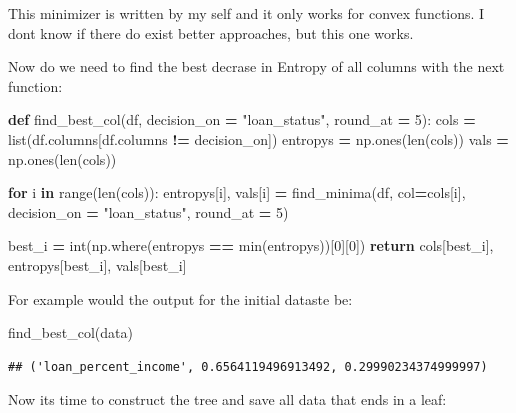 \documentclass[
]{book}
\newenvironment{Shaded}{\begin{snugshade}}{\end{snugshade}}
\newcommand{\BuiltInTok}[1]{#1}
\newcommand{\ControlFlowTok}[1]{\textcolor[rgb]{0.13,0.29,0.53}{\textbf{#1}}}
\newcommand{\DecValTok}[1]{\textcolor[rgb]{0.00,0.00,0.81}{#1}}
\newcommand{\KeywordTok}[1]{\textcolor[rgb]{0.13,0.29,0.53}{\textbf{#1}}}
\newcommand{\NormalTok}[1]{#1}
\newcommand{\OperatorTok}[1]{\textcolor[rgb]{0.81,0.36,0.00}{\textbf{#1}}}
\newcommand{\StringTok}[1]{\textcolor[rgb]{0.31,0.60,0.02}{#1}}
\begin{document}
This minimizer is written by my self and it only works for convex functions. I dont know if there do exist better approaches, but this one works.

Now do we need to find the best decrase in Entropy of all columns with the next function:

\begin{Shaded}
\begin{Highlighting}[]
\KeywordTok{def}\NormalTok{ find\_best\_col(df, decision\_on }\OperatorTok{=} \StringTok{"loan\_status"}\NormalTok{, round\_at }\OperatorTok{=} \DecValTok{5}\NormalTok{):}
\NormalTok{  cols }\OperatorTok{=} \BuiltInTok{list}\NormalTok{(df.columns[df.columns }\OperatorTok{!=}\NormalTok{ decision\_on])}
\NormalTok{  entropys }\OperatorTok{=}\NormalTok{ np.ones(}\BuiltInTok{len}\NormalTok{(cols))}
\NormalTok{  vals }\OperatorTok{=}\NormalTok{ np.ones(}\BuiltInTok{len}\NormalTok{(cols))}
  
  \ControlFlowTok{for}\NormalTok{ i }\KeywordTok{in} \BuiltInTok{range}\NormalTok{(}\BuiltInTok{len}\NormalTok{(cols)):}
\NormalTok{    entropys[i], vals[i] }\OperatorTok{=}\NormalTok{ find\_minima(df, col}\OperatorTok{=}\NormalTok{cols[i], decision\_on }\OperatorTok{=} \StringTok{"loan\_status"}\NormalTok{, round\_at }\OperatorTok{=} \DecValTok{5}\NormalTok{)}
  
\NormalTok{  best\_i }\OperatorTok{=} \BuiltInTok{int}\NormalTok{(np.where(entropys }\OperatorTok{==} \BuiltInTok{min}\NormalTok{(entropys))[}\DecValTok{0}\NormalTok{][}\DecValTok{0}\NormalTok{])}
  \ControlFlowTok{return}\NormalTok{ cols[best\_i], entropys[best\_i], vals[best\_i]}
\end{Highlighting}
\end{Shaded}

For example would the output for the initial dataste be:

\begin{Shaded}
\begin{Highlighting}[]
\NormalTok{find\_best\_col(data)}
\end{Highlighting}
\end{Shaded}

\begin{verbatim}
## ('loan_percent_income', 0.6564119496913492, 0.29990234374999997)
\end{verbatim}

Now its time to construct the tree and save all data that ends in a leaf:
\end{document}
